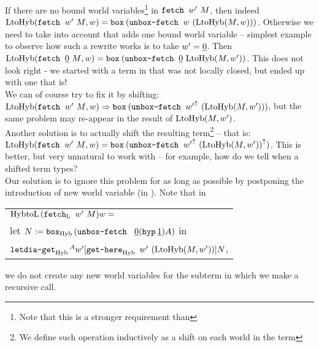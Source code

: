 If there are no bound world variables\footnote{Note that this is a stronger requirement than } in $\fetch{w'}{M}$, then indeed\\
 $\funLtoHyb{\fetch{w'}{M}}{w}{} = \bboxb{(\unboxfetch{w}{(\funLtoHyb{M}{w})})}$. Otherwise we need to take into account that \bboxe{} adds one bound world variable -- simplest example to observe how such a rewrite works is to take $w' = \bvar{0}$. Then $\funLtoHyb{\fetch{\bvar{0}}{M}}{w} = \bboxb{(\unboxfetch{\bvar{0}}{\funLtoHyb{M}{w'}})}$. This does not look right - we started with a term in \langL{} that was not locally closed, but ended up with one that is! \\
We can of course try to fix it by shifting: $\funLtoHyb{\fetch{w'}{M}}{w} => \bboxb{(\unboxfetch{\shift{w'}}{(\funLtoHyb{M}{ w'})})}$, but the same problem may re-appear in the result of $\funLtoHyb{M}{w'}$. \\
Another solution is to actually shift the resulting term\footnote{We define such operation inductively as a shift on each world in the term} -- that is:\\
$\funLtoHyb{\fetch{w'}{M}}{w} = \bboxb{(\unboxfetch{\shift{w'}}{\shift{(\funLtoHyb{M}{w'})}})}$. This is better, but very unnatural to work with -- for example, how do we tell when a shifted term types?\\

Our solution is to ignore this problem for as long as possible by postponing the introduction of new world variable (in \bboxe{}). Note that in 
\begin{center}
\begin{tabular}{ l }
$\funHybtoL{\fetch[\tL]{w'}{M}}{w}= $\\
let  $N := \bboxb[\tHyb]{(\unboxfetch {\bvar{0}} {(\hyp{\bvar{1}})A})}$ in\\
$\letdiagetb[\tHyb]A{w'}{\gethere[\tHyb]{w'}{(\funLtoHyb{M}{w'})}} {N}$,\\
\end{tabular}
\end{center}
we do not create any new world variables for the subterm in which we make a recursive call.\\

